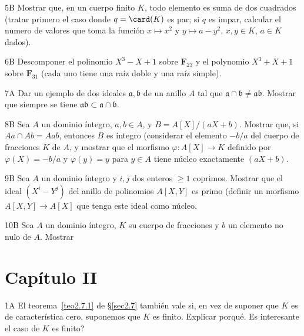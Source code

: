 \documentclass[oneside,bibtotoc,leqno,spanish]{amsbook}
\newcommand{\FF}{\mathbf{F}}
\newcommand{\idl}[1]{\mathfrak{#1}}
\renewcommand{\to}[1][]{\xrightarrow{#1}}
\numberwithin{equation}{section}
\theoremstyle{defi}
\newcommand{\exername}{}
\newtheorem*{namedexer}{\exername}
\newenvironment{exer*}[1]{\renewcommand{\exername}{#1}\begin{namedexer}}{\end{namedexer}}
\theoremstyle{note}
\theoremstyle{rem}
\numberwithin{theorem}{section}
\numberwithin{proposition}{section}
\numberwithin{definition}{section}
\numberwithin{lemma}{section}
\numberwithin{corollary}{section}
\numberwithin{example}{section}
\numberwithin{footnote}{section}%
\begin{document}
\begin{exer*}{5B}
Mostrar que, en un cuerpo finito $K$, todo elemento es suma de dos cuadrados (tratar
primero el caso donde $q = \card(K)$ es par; si $q$ es impar, calcular el numero de valores
que toma la funci\'on $x\mapsto x^2$ y $y\mapsto a-y^2$, $x, y\in K$, $a\in K$ dados).
\end{exer*}

\begin{exer*}{6B}
Descomponer el polinomio $X^3-X+1$ sobre $\FF_{23}$ y el polynomio $X^3+X+1$ sobre
$\FF_{31}$ (cada uno tiene una ra\'iz doble y una ra\'iz simple).
\end{exer*}

\begin{exer*}{7A}
Dar un ejemplo de dos ideales $\idl{a}, \idl{b}$ de un anillo $A$ tal que
$\idl{a}\cap\idl{b}\neq\idl{a}\idl{b}$. Mostrar que siempre se tiene
$\idl{a}\idl{b}\subset\idl{a}\cap\idl{b}$.
\end{exer*}

\begin{exer*}{8B}
Sea $A$ un dominio \'integro, $a, b\in A$, y $B = A[X]/(aX+b)$.
Mostrar que, si $Aa\cap Ab=Aab$, entonces $B$ es \'integro (considerar
el elemento $-b/a$ del cuerpo de fracciones $K$ de $A$, y mostrar que el
morfismo $\varphi : A[X]\to K$ definido por $\varphi(X) = -b/a$ y $\varphi(y) = y$
para $y\in A$ tiene n\'ucleo exactamente $(aX+b)$.
\end{exer*}

\begin{exer*}{9B}
Sea $A$ un dominio \'integro y $i, j$ dos enteros $\geq 1$ coprimos. Mostrar que el
ideal $(X^i-Y^j)$ del anillo de polinomios $A[X,Y]$ es primo (definir un morfismo
$A[X,Y]\to A[X]$ que tenga este ideal como n\'ucleo.
\end{exer*}

\begin{exer*}{10B}
Sea $A$ un dominio \'integro, $K$ su cuerpo de fracciones y $b$ un elemento no nulo
de $A$. Mostrar 
\end{exer*}

\section*{Cap\'itulo II}

\begin{exer*}{1A}
El teorema~\ref{teo2.7.1} de \S\ref{sec2.7} tambi\'en vale si, en vez de suponer que $K$ es
de caracter\'istica cero, suponemos que $K$ es finito. Explicar porqu\'e. Es interesante
el caso de $K$ es finito?
\end{exer*}
\end{document}
